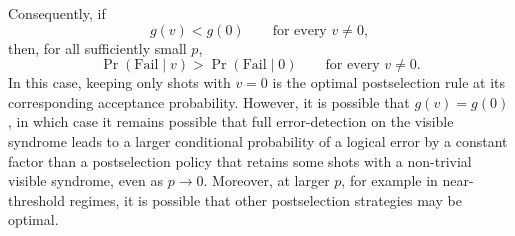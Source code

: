 \documentclass[
    reprint,
    amsmath,amssymb,
    nofootinbib,
    superscriptaddress,
    aps,
    noeprint,
    longbibliography,
    prl
]{revtex4-2}
\theoremstyle{plain}
\begin{document}
Consequently, if
\begin{equation}
    g(v)<g(0)
    \qquad
    \text{for every }v\neq 0,
\end{equation}
then, for all sufficiently small \(p\),
\begin{equation}
    \Pr(\mathrm{Fail}\mid v)
    >
    \Pr(\mathrm{Fail}\mid 0)
    \qquad
    \text{for every }v\neq0.
\end{equation}
In this case, keeping only shots with \(v=0\) is the optimal postselection rule at its corresponding
acceptance probability. However, it is possible that $g(v)=g(0)$, in which case it remains possible
that full error-detection on the visible syndrome leads to a larger conditional probability of a
logical error by a constant factor than a postselection policy that retains some shots with a
non-trivial visible syndrome, even as $p\rightarrow 0$. Moreover, at larger $p$, for example in
near-threshold regimes, it is possible that other postselection strategies may be optimal.





\end{document}
